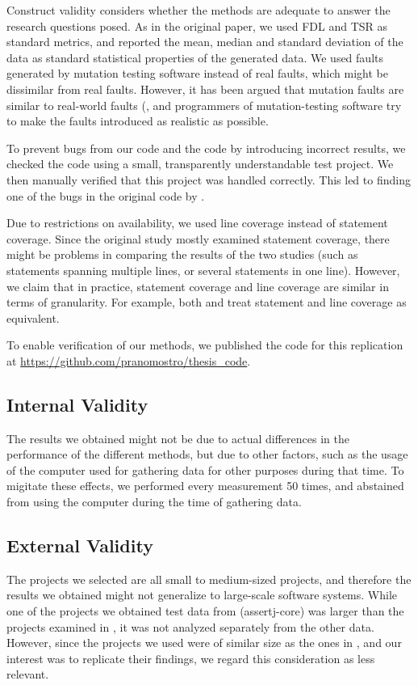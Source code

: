 Construct validity considers whether the methods are adequate to answer
the research questions posed. As in the original paper, we used FDL
and TSR as standard metrics, and reported the mean, median and standard
deviation of the data as standard statistical properties of the generated
data. We used faults generated by mutation testing software instead of
real faults, which might be dissimilar from real faults. However, it
has been argued that mutation faults are similar to real-world faults
(\cite{budd1980mutation}, and programmers of mutation-testing software
try to make the faults introduced as realistic as possible.

To prevent bugs from our code and the code by \cite{cruciani2019scalable}
introducing incorrect results, we checked the code using a small,
transparently understandable test project. We then manually verified
that this project was handled correctly. This led to finding one of
the bugs in the original code by \cite{cruciani2019scalable}.

Due to restrictions on availability, we used line coverage instead of
statement coverage. Since the original study mostly examined statement
coverage, there might be problems in comparing the results of the two
studies (such as statements spanning multiple lines, or several statements
in one line). However, we claim that in practice, statement coverage
and line coverage are similar in terms of granularity.  For example,
both \cite{an2018comparing} and \cite{yang2009survey} treat statement
and line coverage as equivalent.

To enable verification of our methods, we published the code for this
replication at \url{https://github.com/pranomostro/thesis_code}.

\subsection{Internal Validity}

The results we obtained might not be due to actual differences in
the performance of the different methods, but due to other factors,
such as the usage of the computer used for gathering data for other
purposes during that time. To migitate these effects, we performed every
measurement 50 times, and abstained from using the computer during the
time of gathering data.


\subsection{External Validity}

The projects we selected are all small to medium-sized projects,
and therefore the results we obtained might not generalize to
large-scale software systems. While one of the projects we obtained
test data from (assertj-core) was larger than the projects examined in
\cite{cruciani2019scalable}, it was not analyzed separately from the
other data. However, since the projects we used were of similar size
as the ones in \cite{cruciani2019scalable}, and our interest was to
replicate their findings, we regard this consideration as less relevant.

